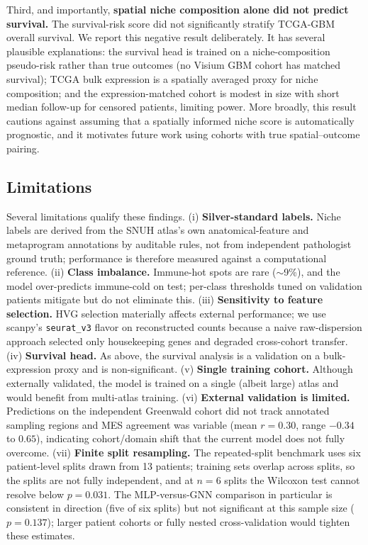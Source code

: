 \documentclass[11pt,letterpaper]{article}
\begin{document}
Third, and importantly, \textbf{spatial niche composition alone did not predict survival.} The survival-risk score did not significantly stratify TCGA-GBM overall survival. We report this negative result deliberately. It has several plausible explanations: the survival head is trained on a niche-composition pseudo-risk rather than true outcomes (no Visium GBM cohort has matched survival); TCGA bulk expression is a spatially averaged proxy for niche composition; and the expression-matched cohort is modest in size with short median follow-up for censored patients, limiting power. More broadly, this result cautions against assuming that a spatially informed niche score is automatically prognostic, and it motivates future work using cohorts with true spatial--outcome pairing.

\subsection{Limitations}

Several limitations qualify these findings. (i) \textbf{Silver-standard labels.} Niche labels are derived from the SNUH atlas's own anatomical-feature and metaprogram annotations by auditable rules, not from independent pathologist ground truth; performance is therefore measured against a computational reference. (ii) \textbf{Class imbalance.} Immune-hot spots are rare ($\sim$9\%), and the model over-predicts immune-cold on test; per-class thresholds tuned on validation patients mitigate but do not eliminate this. (iii) \textbf{Sensitivity to feature selection.} HVG selection materially affects external performance; we use scanpy's \texttt{seurat\_v3} flavor on reconstructed counts because a naive raw-dispersion approach selected only housekeeping genes and degraded cross-cohort transfer. (iv) \textbf{Survival head.} As above, the survival analysis is a validation on a bulk-expression proxy and is non-significant. (v) \textbf{Single training cohort.} Although externally validated, the model is trained on a single (albeit large) atlas and would benefit from multi-atlas training. (vi) \textbf{External validation is limited.} Predictions on the independent Greenwald cohort did not track annotated sampling regions and MES agreement was variable (mean $r = 0.30$, range $-0.34$ to $0.65$), indicating cohort/domain shift that the current model does not fully overcome. (vii) \textbf{Finite split resampling.} The repeated-split benchmark uses six patient-level splits drawn from 13 patients; training sets overlap across splits, so the splits are not fully independent, and at $n=6$ splits the Wilcoxon test cannot resolve below $p=0.031$. The MLP-versus-GNN comparison in particular is consistent in direction (five of six splits) but not significant at this sample size ($p=0.137$); larger patient cohorts or fully nested cross-validation would tighten these estimates.
\end{document}
